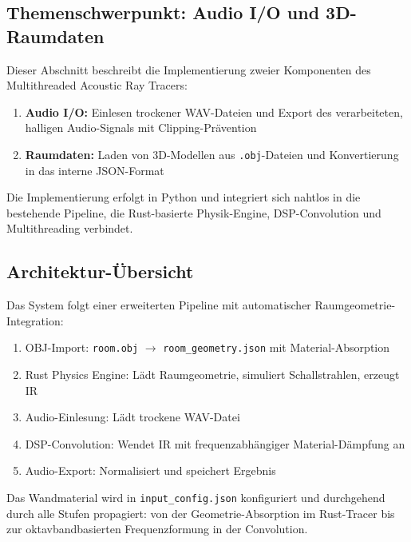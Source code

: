 

\subsection{Themenschwerpunkt: Audio I/O und 3D-Raumdaten}

Dieser Abschnitt beschreibt die Implementierung zweier Komponenten des Multithreaded Acoustic Ray Tracers:

\begin{enumerate}
    \item \textbf{Audio I/O:} Einlesen trockener WAV-Dateien und Export des verarbeiteten, halligen Audio-Signals mit Clipping-Pr\"avention
    \item \textbf{Raumdaten:} Laden von 3D-Modellen aus \texttt{.obj}-Dateien und Konvertierung in das interne JSON-Format
\end{enumerate}

Die Implementierung erfolgt in Python und integriert sich nahtlos in die bestehende Pipeline, die Rust-basierte Physik-Engine, DSP-Convolution und Multithreading verbindet.

\subsection{Architektur-\"Ubersicht}

Das System folgt einer erweiterten Pipeline mit automatischer Raumgeometrie-Integration:

\begin{enumerate}
    \item[\textbf{[0/4]}] OBJ-Import: \texttt{room.obj} $\to$ \texttt{room\_geometry.json} mit Material-Absorption
    \item[\textbf{[1/4]}] Rust Physics Engine: L\"adt Raumgeometrie, simuliert Schallstrahlen, erzeugt IR
    \item[\textbf{[2/4]}] Audio-Einlesung: L\"adt trockene WAV-Datei
    \item[\textbf{[3/4]}] DSP-Convolution: Wendet IR mit frequenzabh\"angiger Material-D\"ampfung an
    \item[\textbf{[4/4]}] Audio-Export: Normalisiert und speichert Ergebnis
\end{enumerate}

Das Wandmaterial wird in \texttt{input\_config.json} konfiguriert und durchgehend durch alle Stufen propagiert: von der Geometrie-Absorption im Rust-Tracer bis zur oktavbandbasierten Frequenzformung in der Convolution.


